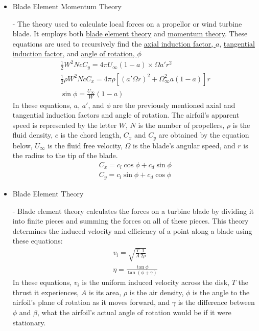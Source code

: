 \documentclass{article}
\begin{document}
\begin{itemize}
	\item \hypertarget{BEM}{Blade Element Momentum Theory} - The theory used to calculate local forces on a propellor or wind turbine blade. It employs both \hyperlink{BET}{blade element theory} and \hyperlink{MT}{momentum theory}. These equations are used to recursively find the \hyperlink{a}{axial induction factor, $a$}, \hyperlink{a'}{tangential induction factor}, and \hyperlink{phi}{angle of rotation, $\phi$}
	\begin{equation}
	\begin{aligned}
		\frac{1}{2} W^{2} N c C_{y} = 4 \pi U_{\infty} (1 - a) \times \Omega a' r^{2} \\
		\frac{1}{2} \rho W^{2} N c C_{x} = 4 \pi \rho [(a' \Omega r)^{2} + \Omega^{2}_{\infty} a (1 - a)] r \\
		\sin \phi = \frac{U_{\infty}}{W} (1 - a)
	\end{aligned}
	\end{equation}
In these equations, $a$, $a'$, and $\phi$ are the previously mentioned axial and tangential induction factors and angle of rotation. The airfoil's apparent speed is represented by the letter $W$, $N$ is the number of propellers, $\rho$ is the fluid density, $c$ is the chord length, $C_{x}$ and $C_{y}$ are obtained by the equation below, $U_{\infty}$ is the fluid free velocity, $\Omega$ is the blade's angular speed, and $r$ is the radius to the tip of the blade.
	\begin{equation}
	\begin{aligned}
		C_{x} = c_{l} \cos{\phi} + c_{d} \sin{\phi} \\
		C_{y} = c_{l} \sin{\phi} + c_{d} \cos{\phi}
	\end{aligned}
	\end{equation}
	
	\item \hypertarget{BET}{Blade Element Theory} - Blade element theory calculates the forces on a turbine blade by dividing it into finite pieces and summing the forces on all of these pieces. This theory determines the induced velocity and efficiency of a point along a blade using these equations:
	\begin{equation}
	\begin{aligned}
		v_{i} = \sqrt{\frac{T}{A} \frac{1}{2 \rho}} \\
        		\eta = \frac{\tan{\phi}}{\tan{(\phi + \gamma)}}
	\end{aligned}
	\end{equation}
In these equations, $v_{i}$ is the uniform induced velocity across the disk, $T$ the thrust it experiences, $A$ is its area, $\rho$ is the air density, $\phi$ is the angle to the airfoil's plane of rotation as it moves forward, and $\gamma$ is the difference between $\phi$ and $\beta$, what the airfoil's actual angle of rotation would be if it were stationary.
	

\end{itemize}
\end{document}
